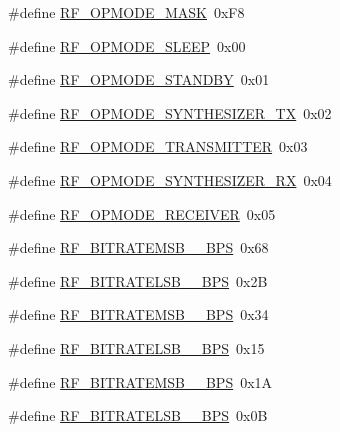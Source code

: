\begin{DoxyCompactItemize}
\item 
\#define \mbox{\hyperlink{sx1276_regs-_fsk_8h_a85461827ea27e5138c9198c75f1bdf6e}{R\+F\+\_\+\+O\+P\+M\+O\+D\+E\+\_\+\+M\+A\+SK}}~0x\+F8
\item 
\#define \mbox{\hyperlink{sx1276_regs-_fsk_8h_a2b5cd905a9116a8a462c28a2d17c483a}{R\+F\+\_\+\+O\+P\+M\+O\+D\+E\+\_\+\+S\+L\+E\+EP}}~0x00
\item 
\#define \mbox{\hyperlink{sx1276_regs-_fsk_8h_a8061431d06917243c6409c4a014c3592}{R\+F\+\_\+\+O\+P\+M\+O\+D\+E\+\_\+\+S\+T\+A\+N\+D\+BY}}~0x01
\item 
\#define \mbox{\hyperlink{sx1276_regs-_fsk_8h_ab384b4d4a5a2e55a8a6eadf18e00e8db}{R\+F\+\_\+\+O\+P\+M\+O\+D\+E\+\_\+\+S\+Y\+N\+T\+H\+E\+S\+I\+Z\+E\+R\+\_\+\+TX}}~0x02
\item 
\#define \mbox{\hyperlink{sx1276_regs-_fsk_8h_a9851bc9741460e2c48415a59f9e3f5ba}{R\+F\+\_\+\+O\+P\+M\+O\+D\+E\+\_\+\+T\+R\+A\+N\+S\+M\+I\+T\+T\+ER}}~0x03
\item 
\#define \mbox{\hyperlink{sx1276_regs-_fsk_8h_a7257f5b516d9fe4c292a87c569ac1519}{R\+F\+\_\+\+O\+P\+M\+O\+D\+E\+\_\+\+S\+Y\+N\+T\+H\+E\+S\+I\+Z\+E\+R\+\_\+\+RX}}~0x04
\item 
\#define \mbox{\hyperlink{sx1276_regs-_fsk_8h_a7a13dffe3a61d783cdbbb0ac11cc85b2}{R\+F\+\_\+\+O\+P\+M\+O\+D\+E\+\_\+\+R\+E\+C\+E\+I\+V\+ER}}~0x05
\item 
\#define \mbox{\hyperlink{sx1276_regs-_fsk_8h_abefe1b1960c632cccac981eed31ddfdf}{R\+F\+\_\+\+B\+I\+T\+R\+A\+T\+E\+M\+S\+B\+\_\+\_\+\+B\+PS}}~0x68
\item 
\#define \mbox{\hyperlink{sx1276_regs-_fsk_8h_a61be3af220402958165d9e69f7f506c6}{R\+F\+\_\+\+B\+I\+T\+R\+A\+T\+E\+L\+S\+B\+\_\+\_\+\+B\+PS}}~0x2B
\item 
\#define \mbox{\hyperlink{sx1276_regs-_fsk_8h_af1a5b1f28fc382c9df4d6e482b448c3c}{R\+F\+\_\+\+B\+I\+T\+R\+A\+T\+E\+M\+S\+B\+\_\+\_\+\+B\+PS}}~0x34
\item 
\#define \mbox{\hyperlink{sx1276_regs-_fsk_8h_a9341847d10e8210454bc8c5abcbef3e3}{R\+F\+\_\+\+B\+I\+T\+R\+A\+T\+E\+L\+S\+B\+\_\+\_\+\+B\+PS}}~0x15
\item 
\#define \mbox{\hyperlink{sx1276_regs-_fsk_8h_a3fbe8a73f4b0a021159cd8046e9e1959}{R\+F\+\_\+\+B\+I\+T\+R\+A\+T\+E\+M\+S\+B\+\_\+\_\+\+B\+PS}}~0x1A
\item 
\#define \mbox{\hyperlink{sx1276_regs-_fsk_8h_a37dfb650a26879afa9a8aa036507b189}{R\+F\+\_\+\+B\+I\+T\+R\+A\+T\+E\+L\+S\+B\+\_\+\_\+\+B\+PS}}~0x0B
\item 

\end{DoxyCompactItemize}
